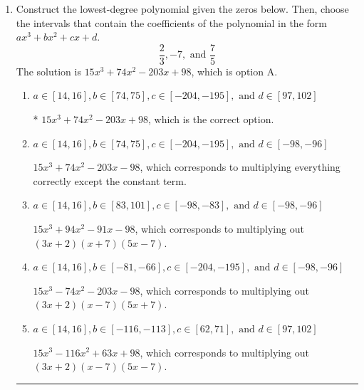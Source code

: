 \documentclass{extbook}[14pt]
\newcommand{\litem}[1]{\item #1

\rule{\textwidth}{0.4pt}}
\begin{document}
\begin{enumerate}\litem{
Construct the lowest-degree polynomial given the zeros below. Then, choose the intervals that contain the coefficients of the polynomial in the form $ax^3+bx^2+cx+d$.
\[ \frac{2}{3}, -7, \text{ and } \frac{7}{5} \]The solution is \( 15x^{3} +74 x^{2} -203 x + 98 \), which is option A.\begin{enumerate}[label=\Alph*.]
\item \( a \in [14, 16], b \in [74, 75], c \in [-204, -195], \text{ and } d \in [97, 102] \)

* $15x^{3} +74 x^{2} -203 x + 98$, which is the correct option.
\item \( a \in [14, 16], b \in [74, 75], c \in [-204, -195], \text{ and } d \in [-98, -96] \)

$15x^{3} +74 x^{2} -203 x -98$, which corresponds to multiplying everything correctly except the constant term.
\item \( a \in [14, 16], b \in [83, 101], c \in [-98, -83], \text{ and } d \in [-98, -96] \)

$15x^{3} +94 x^{2} -91 x -98$, which corresponds to multiplying out $(3x + 2)(x + 7)(5x -7)$.
\item \( a \in [14, 16], b \in [-81, -66], c \in [-204, -195], \text{ and } d \in [-98, -96] \)

$15x^{3} -74 x^{2} -203 x -98$, which corresponds to multiplying out $(3x + 2)(x -7)(5x + 7)$.
\item \( a \in [14, 16], b \in [-116, -113], c \in [62, 71], \text{ and } d \in [97, 102] \)

$15x^{3} -116 x^{2} +63 x + 98$, which corresponds to multiplying out $(3x + 2)(x -7)(5x -7)$.
\end{enumerate}

}
\end{enumerate}
\end{document}
